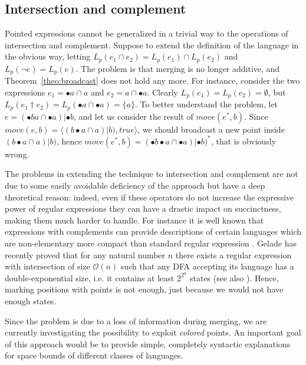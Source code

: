 \documentclass[preprint]{sigplanconf}
\newcommand{\Lp}[1]{L_p(#1)}
\begin{document}
\subsection{Intersection and complement}
\label{sec:intersection}
Pointed expressions cannot be generalized in a trivial way to
the operations of intersection and complement. Suppose to 
extend the definition of the language in the obvious way, letting
$\Lp{e_1 \cap e_2} = \Lp{e_1} \cap \Lp{e_2}$ and 
$\Lp{\neg e} = \overline{\Lp{e}}$. The problem is that merging
is no longer additive, and Theorem~\ref{theo:broadcast} does not
hold any more.
For instance, consider the two expressions $e_1 = \bullet a \cap a$ and
$e_2 = a \cap \bullet a$. Clearly $\Lp{e_1} = \Lp{e_2} = \emptyset$, but
$\Lp {e_1 \dag e_2} = \Lp{\bullet a \cap \bullet a} = \{a\}$.
To better understand the problem, 
let $e = (\bullet ba \cap \bullet a)| \bullet b$, and let us 
consider the result of $move(e^*,b)$. 
Since $move(e,b) = \langle (b\bullet a \cap a)| b), true \rangle$, we should
broadcast a new point inside $(b\bullet a \cap a)| b)$, 
hence $move(e^*,b) = (\bullet b\bullet a \cap \bullet a)| \bullet b)^*$,
that is obviously wrong.

The problems in extending the technique to intersection and complement are
not due to some easily avoidable deficiency of the approach but 
have a deep theoretical reason: indeed, even if these operators do not increase
the expressive power of regular expressions they can have a drastic
impact on succinctness, making them much harder to handle.
For instance it is well known that expressions with
complements can provide descriptions of certain languages which are
non-elementary more compact than standard regular expression \cite{MeyerS72}.
Gelade \cite{Gelade10} has recently proved that for any natural 
number $n$ there exists a regular expression with intersection
of size $\mathcal{O}(n)$ such that any DFA accepting its language has
a double-exponential size, i.e. it contains at least $2^{2^n}$ states
(see also \cite{GruberH08}).
Hence, marking positions with points is not enough, just because we 
would not have enough states. 

Since the problem is due to a loss of information
during merging, we are currently investigating the possibility
to exploit {\em colored} points. An important goal of this
approach would be to provide simple, completely
syntactic explanations for space bounds of different classes
of languages.
\end{document}
